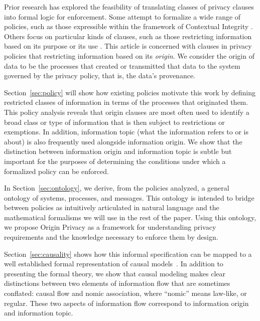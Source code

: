 \documentclass[../thesis.tex]{subfiles}
\begin{document}
Prior research has explored the feasibility of translating
classes of privacy clauses into formal logic for enforcement.
Some attempt to formalize a wide range of policies, such
as those expressible within the framework of Contextual
Integrity \cite{barth07csf,shvartzshnaider2017vaccine}.
Others focus on particular kinds of clauses, such as those
restricting information based on its purpose
\cite{tschantz13esorics} or its use \cite{datta2017use}.
This article is concerned with clauses in privacy policies
that restricting information based on its \emph{origin}.
We consider the origin of data to be the processes that 
created or transmitted that data to the system 
governed by the privacy policy, that is, the data's provenance.

Section~\ref{sec:policy} will show how existing
policies motivate this work
by defining restricted classes of information in terms
of the processes that originated them.
This policy analysis reveals that origin clauses are most
often used to identify a broad class or type of information
that is then subject to restrictions or exemptions.
In addition, information topic
(what the information refers to or is about) is also
frequently used alongside information origin.
We show that the distinction between information origin
and information topic is subtle but important for the
purposes of determining the conditions under which
a formalized policy can be enforced.

In Section~\ref{sec:ontology}, we derive, from the policies
analyzed, a general ontology of systems, processes, and messages.
This ontology is intended to bridge between policies as
intuitively articulated in natural language and the mathematical
formalisms we will use in the rest of the paper.
Using this ontology, we propose Origin Privacy as a
framework for understanding
privacy requirements and the knowledge necessary to enforce
them by design.

Section~\ref{sec:causality} shows how this informal
specification can be mapped to a well established
formal representation
of causal models~\cite{pearl1988probabilistic}.
In addition to presenting the formal theory,
we show that causal modeling makes clear distinctions
between two elements of information flow that are
sometimes conflated: causal flow and nomic association,
where ``nomic'' means law-like, or regular.
These two aspects of information flow correspond
to information origin and information topic.
\end{document}
